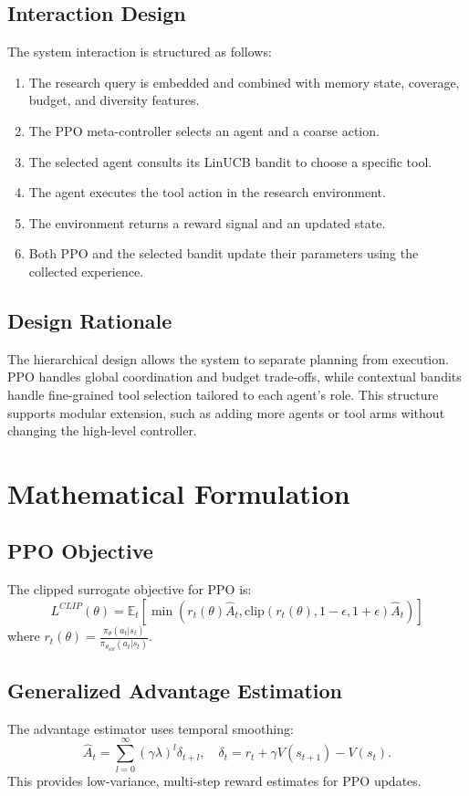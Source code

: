 \documentclass[11pt,a4paper]{article}
\begin{document}
\subsection{Interaction Design}
The system interaction is structured as follows:
\begin{enumerate}[leftmargin=*]
  \item The research query is embedded and combined with memory state, coverage, budget, and diversity features.
  \item The PPO meta-controller selects an agent and a coarse action.
  \item The selected agent consults its LinUCB bandit to choose a specific tool.
  \item The agent executes the tool action in the research environment.
  \item The environment returns a reward signal and an updated state.
  \item Both PPO and the selected bandit update their parameters using the collected experience.
\end{enumerate}

\subsection{Design Rationale}
The hierarchical design allows the system to separate planning from execution. PPO handles global coordination and budget trade-offs, while contextual bandits handle fine-grained tool selection tailored to each agent's role. This structure supports modular extension, such as adding more agents or tool arms without changing the high-level controller.

\section{Mathematical Formulation}
\subsection{PPO Objective}
The clipped surrogate objective for PPO is:
\begin{equation}
L^{CLIP}(\theta) = \mathbb{E}_t\left[\min\left(r_t(\theta) \hat{A}_t, \text{clip}(r_t(\theta), 1-\epsilon, 1+\epsilon) \hat{A}_t\right)\right]
\end{equation}
where $r_t(\theta) = \frac{\pi_\theta(a_t|s_t)}{\pi_{\theta_{old}}(a_t|s_t)}$.

\subsection{Generalized Advantage Estimation}
The advantage estimator uses temporal smoothing:
\begin{equation}
\hat{A}_t = \sum_{l=0}^{\infty} (\gamma \lambda)^l \delta_{t+l}, \quad \delta_t = r_t + \gamma V(s_{t+1}) - V(s_t).
\end{equation}
This provides low-variance, multi-step reward estimates for PPO updates.
\end{document}
